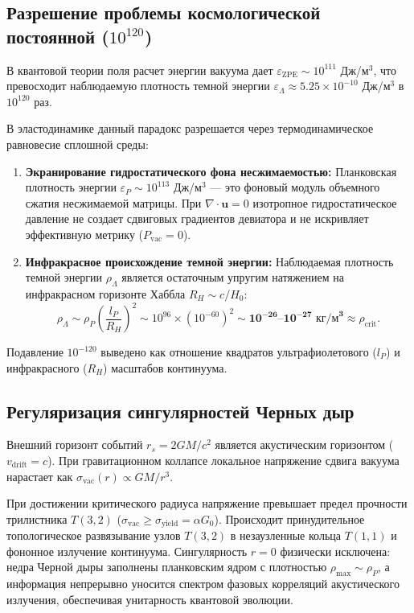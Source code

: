 \documentclass[12pt,a4paper]{article}
\begin{document}
	\subsection{Разрешение проблемы космологической постоянной ($10^{120}$)}
	В квантовой теории поля расчет энергии вакуума дает $\varepsilon_{\text{ZPE}} \sim 10^{111}$ Дж/м$^3$, что превосходит наблюдаемую плотность темной энергии $\varepsilon_\Lambda \approx 5.25 \times 10^{-10}$ Дж/м$^3$ в $10^{120}$ раз.
	
	В эластодинамике данный парадокс разрешается через термодинамическое равновесие сплошной среды:
	\begin{enumerate}
		\item \textbf{Экранирование гидростатического фона несжимаемостью:} Планковская плотность энергии $\varepsilon_P \sim 10^{113}$ Дж/м$^3$ --- это фоновый модуль объемного сжатия несжимаемой матрицы. При $\nabla \cdot \mathbf{u} = 0$ изотропное гидростатическое давление не создает сдвиговых градиентов девиатора и не искривляет эффективную метрику ($P_{\text{vac}} = 0$).
		\item \textbf{Инфракрасное происхождение темной энергии:} Наблюдаемая плотность темной энергии $\rho_\Lambda$ является остаточным упругим натяжением на инфракрасном горизонте Хаббла $R_H \sim c/H_0$:
		\begin{equation}
			\rho_\Lambda \sim \rho_P \left( \frac{l_P}{R_H} \right)^2 \sim 10^{96} \times (10^{-60})^2 \sim \mathbf{10^{-26} \text{--} 10^{-27} \text{ кг/м}^3} \approx \rho_{\text{crit}}.
		\end{equation}
	\end{enumerate}
	Подавление $10^{-120}$ выведено как отношение квадратов ультрафиолетового ($l_P$) и инфракрасного ($R_H$) масштабов континуума.
	
	\subsection{Регуляризация сингулярностей Черных дыр}
	Внешний горизонт событий $r_s = 2GM/c^2$ является акустическим горизонтом ($v_{\text{drift}} = c$). При гравитационном коллапсе локальное напряжение сдвига вакуума нарастает как $\sigma_{\text{vac}}(r) \propto GM/r^3$.
	
	При достижении критического радиуса напряжение превышает предел прочности трилистника $T(3,2)$ ($\sigma_{\text{vac}} \ge \sigma_{\text{yield}} = \alpha G_0$). Происходит принудительное топологическое развязывание узлов $T(3,2)$ в незаузленные кольца $T(1,1)$ и фононное излучение континуума. Сингулярность $r=0$ физически исключена: недра Черной дыры заполнены планковским ядром с плотностью $\rho_{\text{max}} \sim \rho_P$, а информация непрерывно уносится спектром фазовых корреляций акустического излучения, обеспечивая унитарность квантовой эволюции.
	
\end{document}
